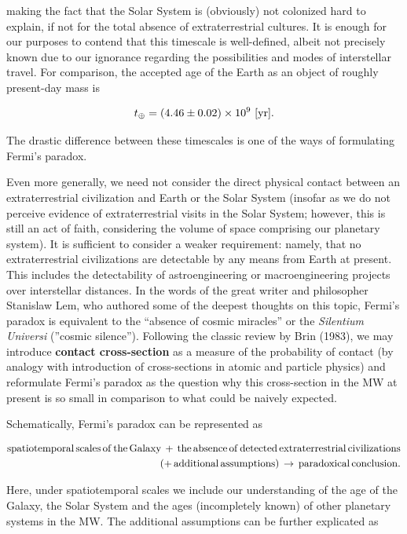 \documentclass[a4paper,10pt]{article}
\begin{document}
{\noindent}making the fact that the Solar System is (obviously) not colonized hard to explain, if not for the total absence of extraterrestrial cultures. It is enough for our purposes to contend that this timescale is well-defined, albeit not precisely known due to our ignorance regarding the possibilities and modes of interstellar travel. For comparison, the accepted age of the Earth as an object of roughly present-day mass is

\begin{align*}
    t_\oplus = (4.46\pm0.02)\times10^9 ~ [{\rm yr}].
\end{align*}

{\noindent}The drastic difference between these timescales is one of the ways of formulating Fermi's paradox.

{\noindent}Even more generally, we need not consider the direct physical contact between an extraterrestrial civilization and Earth or the Solar System (insofar as we do not perceive evidence of extraterrestrial visits in the Solar System; however, this is still an act of faith, considering the volume of space comprising our planetary system). It is sufficient to consider a weaker requirement: namely, that no extraterrestrial civilizations are detectable by any means from Earth at present. This includes the detectability of astroengineering or macroengineering projects over interstellar distances. In the words of the great writer and philosopher Stanislaw Lem, who authored some of the deepest thoughts on this topic, Fermi's paradox is equivalent to the ``absence of cosmic miracles'' or the \textit{Silentium Universi} (”cosmic silence”). Following the classic review by Brin (1983), we may introduce \textbf{contact cross-section} as a measure of the probability of contact (by analogy with introduction of cross-sections in atomic and particle physics) and reformulate Fermi's paradox as the question why this cross-section in the MW at present is so small in comparison to what could be naively expected.

{\noindent}Schematically, Fermi's paradox can be represented as

\begin{align*}
    {\rm spatiotemporal\,scales\,of\,the\,Galaxy\,+\,the\,absence\,of\,detected\,extraterrestrial\,civilizations}\\ {\rm (+\,additional\,assumptions)\,\rightarrow\,paradoxical\,conclusion.}
\end{align*}

{\noindent}Here, under spatiotemporal scales we include our understanding of the age of the Galaxy, the Solar System and the ages (incompletely known) of other planetary systems in the MW. The additional assumptions can be further explicated as
\end{document}
